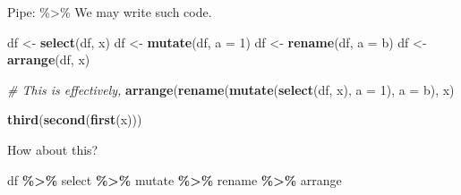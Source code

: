 \documentclass[
  10pt,
  ignorenonframetext,
  serif]{beamer}
\newenvironment{Shaded}{\begin{snugshade}}{\end{snugshade}}
\newcommand{\CommentTok}[1]{\textcolor[rgb]{0.56,0.35,0.01}{\textit{#1}}}
\newcommand{\DataTypeTok}[1]{\textcolor[rgb]{0.13,0.29,0.53}{#1}}
\newcommand{\DecValTok}[1]{\textcolor[rgb]{0.00,0.00,0.81}{#1}}
\newcommand{\KeywordTok}[1]{\textcolor[rgb]{0.13,0.29,0.53}{\textbf{#1}}}
\newcommand{\NormalTok}[1]{#1}
\newcommand{\OperatorTok}[1]{\textcolor[rgb]{0.81,0.36,0.00}{\textbf{#1}}}
\newcommand{\StringTok}[1]{\textcolor[rgb]{0.31,0.60,0.02}{#1}}
\begin{document}
\begin{frame}[fragile]{Pipe: \%\textgreater\%}
\protect\hypertarget{pipe}{}
We may write such code.

\begin{Shaded}
\begin{Highlighting}[]
\NormalTok{df \textless{}{-}}\StringTok{ }\KeywordTok{select}\NormalTok{(df, x)}
\NormalTok{df \textless{}{-}}\StringTok{ }\KeywordTok{mutate}\NormalTok{(df, }\DataTypeTok{a =} \DecValTok{1}\NormalTok{)}
\NormalTok{df \textless{}{-}}\StringTok{ }\KeywordTok{rename}\NormalTok{(df, }\DataTypeTok{a =}\NormalTok{ b)}
\NormalTok{df \textless{}{-}}\StringTok{ }\KeywordTok{arrange}\NormalTok{(df, x)}

\CommentTok{\# This is effectively,}
\KeywordTok{arrange}\NormalTok{(}\KeywordTok{rename}\NormalTok{(}\KeywordTok{mutate}\NormalTok{(}\KeywordTok{select}\NormalTok{(df, x), }\DataTypeTok{a =} \DecValTok{1}\NormalTok{), }\DataTypeTok{a =}\NormalTok{ b), x)}

\KeywordTok{third}\NormalTok{(}\KeywordTok{second}\NormalTok{(}\KeywordTok{first}\NormalTok{(x)))}
\end{Highlighting}
\end{Shaded}

How about this?

\begin{Shaded}
\begin{Highlighting}[]
\NormalTok{df }\OperatorTok{\%\textgreater{}\%}\StringTok{ }\NormalTok{select }\OperatorTok{\%\textgreater{}\%}\StringTok{ }\NormalTok{mutate }\OperatorTok{\%\textgreater{}\%}\StringTok{ }\NormalTok{rename }\OperatorTok{\%\textgreater{}\%}\StringTok{ }\NormalTok{arrange}
\end{Highlighting}
\end{Shaded}
\end{frame}
\end{document}
